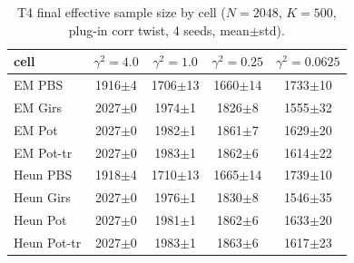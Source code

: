\begin{table}[ht]
\centering
\caption{T4 final effective sample size by cell ($N=2048$, $K=500$, plug-in corr twist, 4 seeds, mean$\pm$std).}
\label{tab:toy_t4_ess}
\begin{tabular}{lcccc}
\toprule
cell & $\gamma^2=4.0$ & $\gamma^2=1.0$ & $\gamma^2=0.25$ & $\gamma^2=0.0625$ \\
\midrule
EM PBS & 1916$\pm$4 & 1706$\pm$13 & 1660$\pm$14 & 1733$\pm$10 \\
EM Girs & 2027$\pm$0 & 1974$\pm$1 & 1826$\pm$8 & 1555$\pm$32 \\
EM Pot & 2027$\pm$0 & 1982$\pm$1 & 1861$\pm$7 & 1629$\pm$20 \\
EM Pot-tr & 2027$\pm$0 & 1983$\pm$1 & 1862$\pm$6 & 1614$\pm$22 \\
Heun PBS & 1918$\pm$4 & 1710$\pm$13 & 1665$\pm$14 & 1739$\pm$10 \\
Heun Girs & 2027$\pm$0 & 1976$\pm$1 & 1830$\pm$8 & 1546$\pm$35 \\
Heun Pot & 2027$\pm$0 & 1981$\pm$1 & 1862$\pm$6 & 1633$\pm$20 \\
Heun Pot-tr & 2027$\pm$0 & 1983$\pm$1 & 1863$\pm$6 & 1617$\pm$23 \\
\bottomrule
\end{tabular}
\end{table}
